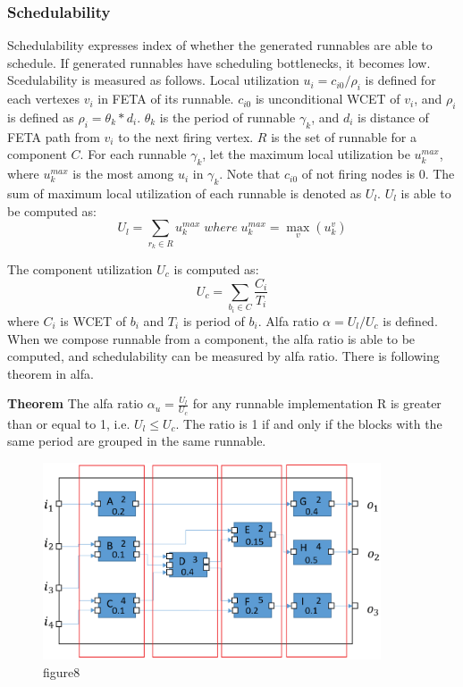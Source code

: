 \documentclass[conference,compsoc]{IEEEtran}
\begin{document}
\subsubsection{Schedulability}
 Schedulability expresses index of whether the generated runnables are able to schedule.
If generated runnables have scheduling bottlenecks, it becomes low.
Scedulability is measured as follows.
 Local utilization $u_i = c_{i0} / \rho_i$ is defined for each vertexes $v_i$ in  FETA \cite{Lublinerman:2009:MCG:1480881.1480893} of its runnable.
$c_{i0}$ is unconditional WCET of $v_i$, and $\rho_i$ is defined as $\rho_i = \theta_k * d_i$.
$\theta_k$ is the period of runnable  $\gamma_k$, and $d_i$ is distance of FETA path from $v_i$ to the next firing vertex.
$R$ is the set of runnable for a component $C$.
For each runnable $\gamma_k$, let the maximum local utilization  be $u_{k}^{max}$, where $u_k^{max}$ is the most among $u_i$ in $\gamma_k$.  
Note that $c_{i0}$ of not firing nodes is 0.
The sum of maximum local utilization of each runnable is denoted as $U_l$.
$U_l$ is able to be computed as:
\begin{equation}
 U_l = \sum_{r_k \in R} u_{k}^{max}\;where\;u_{k}^{max} = \max_{v}(u_{k}^{v})
\end{equation}

The component utilization $U_c$ is computed as:
\begin{equation}
U_c = \sum_{b_i \in C} \frac{C_i}{T_i}
\end{equation}
where $C_i$ is WCET of $b_i$ and $T_i$ is period of $b_i$.
 Alfa ratio $\alpha = U_l/U_c$ is defined.
When we compose runnable from a component, the alfa ratio is able to be computed, and schedulability can be measured by alfa ratio.
There is following theorem in alfa.

{\bf Theorem} The alfa ratio $\alpha_u = \frac{U_l}{U_c}$ for any runnable implementation R is greater than or equal to 1, i.e. $U_l \le U_c$.
The ratio is 1 if and only if the blocks with the same period are grouped in the same runnable.

\begin{figure}
	\centering
	\includegraphics[width=10cm,clip]{figure1.eps}
	\caption{figure8}
	\label{fig8}
\end{figure}
\end{document}
